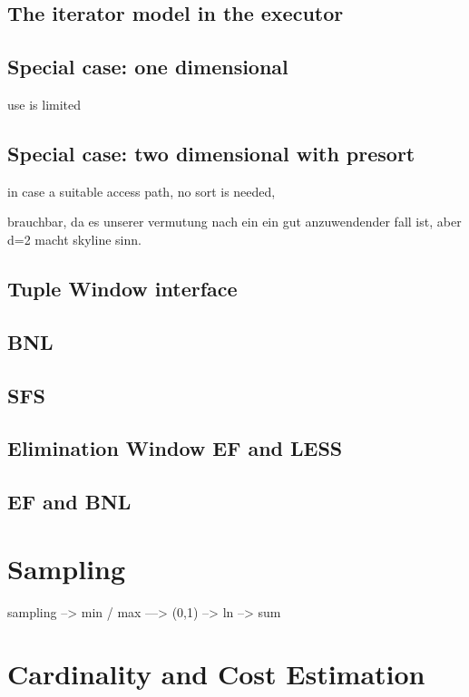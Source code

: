 \subsection{The iterator model in the executor}

\subsection{Special case: one dimensional}
use is limited


\subsection{Special case: two dimensional with presort}
in case a suitable access path, no sort is needed,

brauchbar, da es unserer vermutung nach ein ein gut anzuwendender fall ist, aber d=2 macht skyline sinn.


\subsection{Tuple Window interface}

\subsection{BNL}

\subsection{SFS}

\subsection{Elimination Window EF and LESS}

\subsection{EF and BNL}

\section{Sampling}

sampling --> min / max  ---> (0,1) --> ln   --> sum

\section{Cardinality and Cost Estimation}

